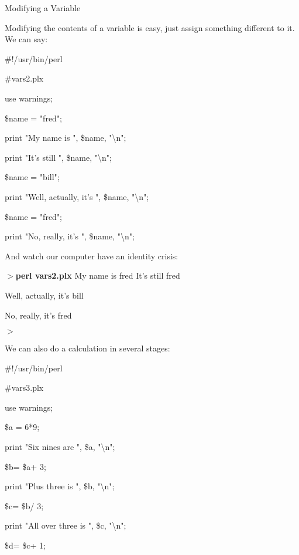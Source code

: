 \documentclass[a4paper,11pt]{book}
\begin{document}
\noindent Modifying a Variable

\noindent 

\noindent Modifying the contents of a variable is easy, just assign something different to it. We can say:

\noindent 

\noindent \#!/usr/bin/perl

\noindent \#vars2.plx

\noindent use warnings;

\noindent \$name = "fred";

\noindent print "My name is ", \$name, "\textbackslash n";

\noindent print "It's still ", \$name, "\textbackslash n";

\noindent \$name = "bill";

\noindent print "Well, actually, it's ", \$name, "\textbackslash n";

\noindent \$name = "fred";

\noindent print "No, really, it's ", \$name, "\textbackslash n";

\noindent 

\noindent And watch our computer have an identity crisis:

\noindent 

\noindent $>$\textbf{perl vars2.plx }My name is fred It's still fred

\noindent Well, actually, it's bill

\noindent No, really, it's fred

\noindent $>$

\noindent 

\noindent We can also do a calculation in several stages:

\noindent 

\noindent \#!/usr/bin/perl

\noindent \#vars3.plx

\noindent use warnings;

\noindent \$a = 6*9;

\noindent print "Six nines are ", \$a, "\textbackslash n";

\noindent \$b= \$a+ 3;

\noindent print "Plus three is ", \$b, "\textbackslash n";

\noindent \$c= \$b/ 3;

\noindent print "All over three is ", \$c, "\textbackslash n";

\noindent \$d= \$c+ 1;
\end{document}
